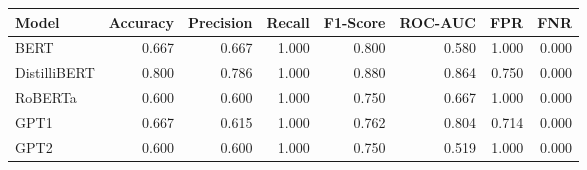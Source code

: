 \begin{tabular}{|l||r|r|r|r|r|r|r|}
\toprule
Model & \textbf{Accuracy} & \textbf{Precision} & Recall & \textbf{F1-Score} & \textbf{ROC-AUC} & \textbf{FPR} & FNR \\
\midrule \midrule
BERT & 0.667 & 0.667 & 1.000 & 0.800 & 0.580 & 1.000 & 0.000 \\
DistilliBERT & 0.800 & 0.786 & 1.000 & 0.880 & 0.864 & 0.750 & 0.000 \\
RoBERTa & 0.600 & 0.600 & 1.000 & 0.750 & 0.667 & 1.000 & 0.000 \\
GPT1 & 0.667 & 0.615 & 1.000 & 0.762 & 0.804 & 0.714 & 0.000 \\
GPT2 & 0.600 & 0.600 & 1.000 & 0.750 & 0.519 & 1.000 & 0.000 \\
\bottomrule
\end{tabular}